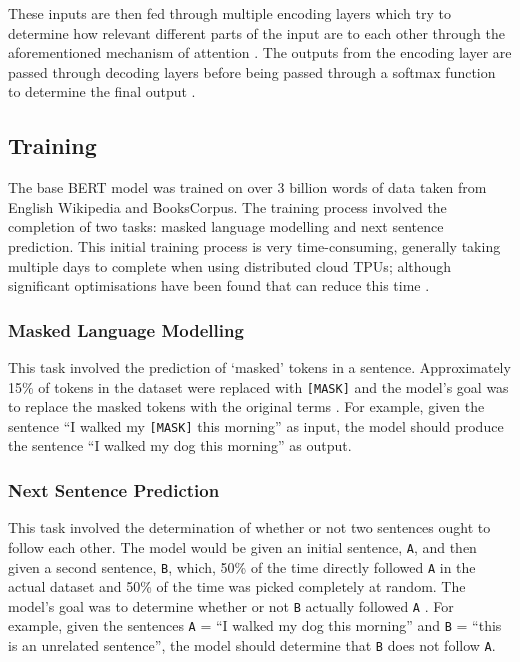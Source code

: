 These inputs are then fed through multiple encoding layers which try to determine how relevant different parts of the input are to each other through the aforementioned mechanism of attention \cite{AlammarTransformer}. The outputs from the encoding layer are passed through decoding layers before being passed through a softmax function to determine the final output \cite{Devlin2018_BERT}.

\subsection{Training} \label{sec:TBG_BERT_Train}

The base BERT model was trained on over 3 billion words of data taken from English Wikipedia and BooksCorpus. The training process involved the completion of two tasks: masked language modelling and next sentence prediction. This initial training process is very time-consuming, generally taking multiple days to complete when using distributed cloud TPUs; although significant optimisations have been found that can reduce this time \cite{you2019large}.

\subsubsection{Masked Language Modelling}

This task involved the prediction of `masked' tokens in a sentence. Approximately 15\% of tokens in the dataset were replaced with \texttt{[MASK]} and the model's goal was to replace the masked tokens with the original terms \cite{Devlin2018_BERT}. For example, given the sentence ``I walked my \texttt{[MASK]} this morning'' as input, the model should produce the sentence ``I walked my dog this morning'' as output.

\subsubsection{Next Sentence Prediction}

This task involved the determination of whether or not two sentences ought to follow each other. The model would be given an initial sentence, \texttt{A}, and then given a second sentence, \texttt{B}, which, 50\% of the time directly followed \texttt{A} in the actual dataset and 50\% of the time was picked completely at random. The model's goal was to determine whether or not \texttt{B} actually followed \texttt{A} \cite{Devlin2018_BERT}. For example, given the sentences \texttt{A} = ``I walked my dog this morning'' and \texttt{B} = ``this is an unrelated sentence'', the model should determine that \texttt{B} does not follow \texttt{A}.

